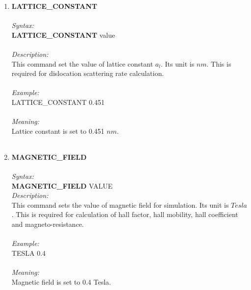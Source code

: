 \documentclass[12pt]{article}
\begin{document}
\begin{enumerate}

    \item \textbf{LATTICE\_CONSTANT}   \\ \\
    \textit{Syntax:} \\
    \textbf{LATTICE\_CONSTANT} value \\ \\
    \textit{Description:} \\
    This command set the value of lattice constant $a_l$. Its unit is $nm$. This is required for dislocation scattering rate calculation. \\ \\
    \textit{Example:} \\
    LATTICE\_CONSTANT 0.451 \\ \\
    \textit{Meaning:} \\    
    Lattice constant is set to 0.451 $nm$. \\ \\

    \item \textbf{MAGNETIC\_FIELD}   \\ \\
    \textit{Syntax:} \\
    \textbf{MAGNETIC\_FIELD} VALUE \\
    \textit{Description:} \\
    This command sets the value of magnetic field for simulation. Its unit is $Tesla$. This is required for calculation of hall factor, hall mobility, hall coefficient and magneto-resistance.\\ \\
    \textit{Example:} \\
    TESLA 0.4 \\ \\
    \textit{Meaning:} \\    
    Magnetic field is set to 0.4 Tesla. \\  \\


\end{enumerate}
\end{document}
